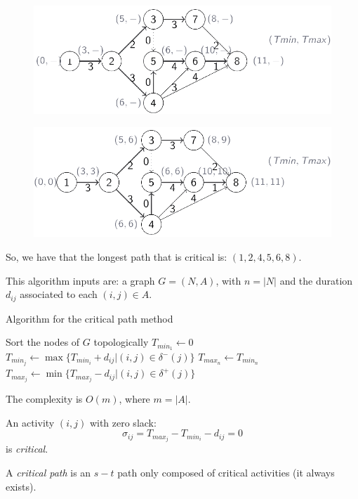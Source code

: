 \documentclass[12pt, a4paper]{report}
\begin{document}
\begin{example}
        \begin{figure}[H]
            \centering
            \includegraphics[width=0.75\linewidth]{images/aproject.png}
        \end{figure}
        \begin{figure}[H]
            \centering
            \includegraphics[width=0.75\linewidth]{images/aproject1.png}
        \end{figure}
        So, we have that the longest path that is critical is: $(1,2,4,5,6,8)$.
    \end{example}
    This algorithm inputs are: a graph $G = (N,A)$, with $n= \left\lvert N \right\rvert $ and the duration $d_{ij}$ associated to each $(i,j) \in A$. 
    \begin{algorithm}[H]
        \caption{Algorithm for the critical path method}
            \begin{algorithmic}[1]
                \State Sort the nodes of $G$ topologically
                \State $T_{min_1} \leftarrow 0$
                    \State $T_{min_j} \leftarrow \max\{T_{min_i}+d_{ij}|(i,j) \in \delta^{-}(j)\}$
                \EndFor
                \State $T_{max_n} \leftarrow T_{min_n}$
                \State $T_{max_j} \leftarrow \min\{T_{max_j}-d_{ij}|(i,j) \in \delta^{+}(j)\}$
                \EndFor
            \end{algorithmic}
    \end{algorithm}
    The complexity is $O(m)$, where $m = \left\lvert A \right\rvert $. 
    \begin{definition}
        An activity $(i,j)$ with zero slack: 
        \[\sigma_{ij}=T_{max_j}-T_{min_i}-d_{ij}=0\]
        is \emph{critical}. 

        A \emph{critical path} is an $s-t$ path only composed of critical activities (it always exists).
    \end{definition}
\end{document}
